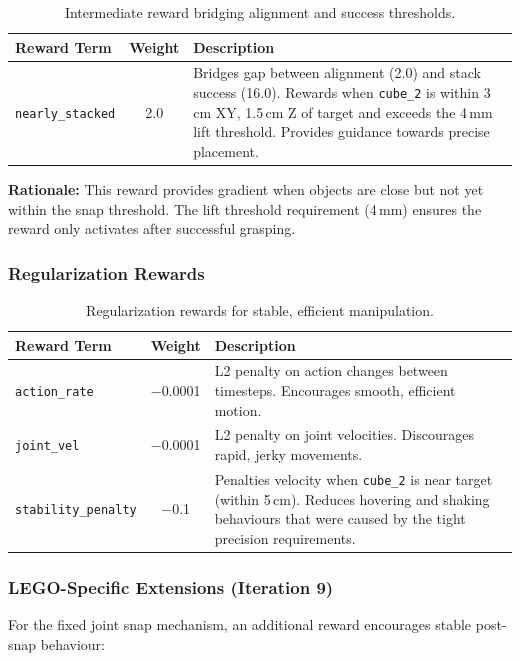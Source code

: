 \documentclass[12pt,a4paper,oneside]{report}
\begin{document}
\begin{table}[h]
\centering
\small
\begin{tabular}{|l|c|p{8cm}|}
\hline
\textbf{Reward Term} & \textbf{Weight} & \textbf{Description} \\
\hline
\texttt{nearly\_stacked} & 2.0 & Bridges gap between alignment (2.0) and stack success (16.0). Rewards when \texttt{cube\_2} is within 3\,cm XY, 1.5\,cm Z of target and exceeds the 4\,mm lift threshold. Provides guidance towards precise placement. \\
\hline
\end{tabular}
\caption{Intermediate reward bridging alignment and success thresholds.}
\end{table}

\textbf{Rationale:} This reward provides gradient when objects are close but not yet within the snap threshold. The lift threshold requirement (4\,mm) ensures the reward only activates after successful grasping.

\subsubsection{Regularization Rewards}

\begin{table}[h]
\centering
\small
\begin{tabular}{|l|c|p{8cm}|}
\hline
\textbf{Reward Term} & \textbf{Weight} & \textbf{Description} \\
\hline
\texttt{action\_rate} & $-$0.0001 & L2 penalty on action changes between timesteps. Encourages smooth, efficient motion. \\
\hline
\texttt{joint\_vel} & $-$0.0001 & L2 penalty on joint velocities. Discourages rapid, jerky movements. \\
\hline
\texttt{stability\_penalty} & $-$0.1 & Penalties velocity when \texttt{cube\_2} is near target (within 5\,cm). Reduces hovering and shaking behaviours that were caused by the tight precision requirements. \\
\hline
\end{tabular}
\caption{Regularization rewards for stable, efficient manipulation.}
\end{table}

\subsubsection{LEGO-Specific Extensions (Iteration 9)}

For the fixed joint snap mechanism, an additional reward encourages stable post-snap behaviour:
\end{document}
